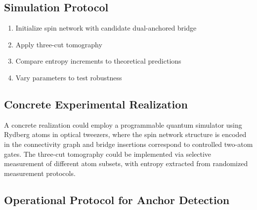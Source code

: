 \documentclass[11pt]{article}
\theoremstyle{plain}
\theoremstyle{definition}
\begin{document}
\subsection{Simulation Protocol}
\begin{enumerate}
  \item Initialize spin network with candidate dual-anchored bridge
  \item Apply three-cut tomography
  \item Compare entropy increments to theoretical predictions
  \item Vary parameters to test robustness
\end{enumerate}

\subsection{Concrete Experimental Realization}
A concrete realization could employ a programmable quantum simulator using Rydberg atoms in optical tweezers, where the spin network structure is encoded in the connectivity graph and bridge insertions correspond to controlled two-atom gates. The three-cut tomography could be implemented via selective measurement of different atom subsets, with entropy extracted from randomized measurement protocols.

\subsection{Operational Protocol for Anchor Detection}
\label{subsec:anchor-protocol}
\end{document}
